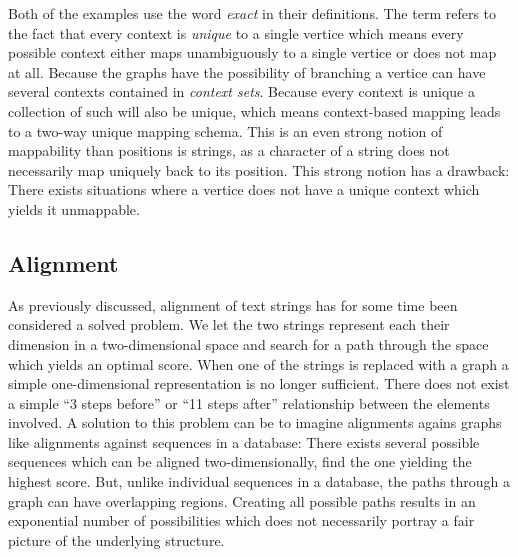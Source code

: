 \documentclass[thesis.tex]{subfiles}
\begin{document}
\par\noindent
Both of the examples use the word \textit{exact} in their definitions. The term refers to the fact that every context is \textit{unique} to a single vertice which means every possible context either maps unambiguously to a single vertice or does not map at all. Because the graphs have the possibility of branching a vertice can have several contexts contained in \textit{context sets}. Because every context is unique a collection of such will also be unique, which means context-based mapping leads to a two-way unique mapping schema. This is an even strong notion of mappability than positions is strings, as a character of a string does not necessarily map uniquely back to its position. This strong notion has a drawback: There exists situations where a vertice does not have a unique context which yields it unmappable.
\subsection{Alignment}
As previously discussed, alignment of text strings has for some time been considered a solved problem. We let the two strings represent each their dimension in a two-dimensional space and search for a path through the space which yields an optimal score. When one of the strings is replaced with a graph a simple one-dimensional representation is no longer sufficient. There does not exist a simple ``3 steps before'' or ``11 steps after'' relationship between the elements involved. A solution to this problem can be to imagine alignments agains graphs like alignments against sequences in a database: There exists several possible sequences which can be aligned two-dimensionally, find the one yielding the highest score. But, unlike individual sequences in a database, the paths through a graph can have overlapping regions. Creating all possible paths results in an exponential number of possibilities which does not necessarily portray a fair picture of the underlying structure.
\end{document}

